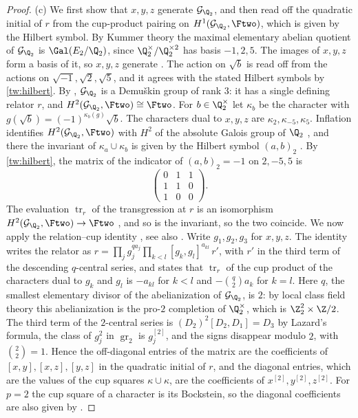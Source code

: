 \begin{proof}
(c) We first show that $x,y,z$ generate $\mathcal G_{\Q_2}$, and then read
off the quadratic initial of $r$ from the cup-product pairing on
$H^1(\mathcal G_{\Q_2},\Ftwo)$, which is given by the Hilbert symbol.
By Kummer theory the maximal elementary abelian quotient of
$\mathcal G_{\Q_2}$ is $\Gal(E_2/\Q_2)$, since $\Q_2^\times/\Q_2^{\times2}$
has basis $-1,2,5$. The images of $x,y,z$ form a basis of it, so $x,y,z$
generate \cite[Proposition~3.9.1]{NeukirchSchmidtWingberg2008}. The action on
$\sqrt b$ is read off from the actions on $\sqrt{-1},\sqrt2,\sqrt5$, and it
agrees with the stated Hilbert symbols by \eqref{tw:hilbert}. By
\cite[Theorem~7.5.11]{NeukirchSchmidtWingberg2008}, $\mathcal G_{\Q_2}$ is a
Demu\v skin group of rank $3$: it has a single defining relator $r$, and
$H^2(\mathcal G_{\Q_2},\Ftwo)\cong\Ftwo$. For $b\in\Q_2^\times$ let $\kappa_b$
be the character with $g(\sqrt b)=(-1)^{\kappa_b(g)}\sqrt b$. The characters
dual to $x,y,z$ are $\kappa_2,\kappa_{-5},\kappa_5$. Inflation identifies
$H^2(\mathcal G_{\Q_2},\Ftwo)$ with $H^2$ of the absolute Galois group of
$\Q_2$ \cite[Proposition~7.5.8]{NeukirchSchmidtWingberg2008}, and there the
invariant of $\kappa_a\cup\kappa_b$ is given by the Hilbert symbol $(a,b)_2$
\cite[Chapter~III, Section~4]{MilneCFT}. By \eqref{tw:hilbert}, the matrix of
the indicator of $(a,b)_2=-1$ on $2,-5,5$ is
\[
 \begin{pmatrix}0&1&1\\1&1&0\\1&0&0\end{pmatrix}.
\]
The evaluation $\operatorname{tr}_r$ of the transgression at $r$ is an
isomorphism $H^2(\mathcal G_{\Q_2},\Ftwo)\to\Ftwo$
\cite[Proposition~3.9.12(iii)]{NeukirchSchmidtWingberg2008}, and so is the
invariant, so the two coincide. We now apply the relation--cup identity
\cite[Proposition~3.9.13(ii)]{NeukirchSchmidtWingberg2008}, see also
\cite[Proposition~3.2]{Quadrelli2021}. Write $g_1,g_2,g_3$ for $x,y,z$. The
identity writes the relator as
$r=\prod_jg_j^{qa_j}\prod_{k<l}[g_k,g_l]^{a_{kl}}\,r'$, with $r'$ in the
third term of the descending $q$-central series, and states that
$\operatorname{tr}_r$ of the cup product of the characters dual to $g_k$ and
$g_l$ is $-a_{kl}$ for $k<l$ and $-\binom q2a_k$ for $k=l$. Here $q$, the
smallest elementary divisor of the
abelianization of $\mathcal G_{\Q_2}$, is $2$: by local class field theory
this abelianization is the pro-$2$ completion of $\Q_2^\times$, which is
$\Z_2^2\times\Z/2$. The third term of the $2$-central series is
$(D_2)^2[D_2,D_1]=D_3$ by Lazard's formula, the class of $g_j^2$ in
$\operatorname{gr}_2$ is $g_j^{[2]}$, and the signs disappear modulo $2$,
with $\binom22=1$. Hence the off-diagonal entries of the matrix are the
coefficients of $[x,y],[x,z],[y,z]$ in the quadratic initial of $r$, and the
diagonal entries, which are the values of the cup squares $\kappa\cup\kappa$,
are the coefficients of $x^{[2]},y^{[2]},z^{[2]}$. For $p=2$ the cup square
of a character is its Bockstein, so the diagonal coefficients are also given
by \cite[Proposition~3.9.14]{NeukirchSchmidtWingberg2008}.
\end{proof}

